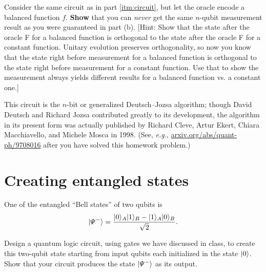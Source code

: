 \documentclass{../phys084}
\begin{document}
\begin{exercise}
\begin{problems}
\begin{center}
    \end{center}

  \item Consider the same circuit as in part \ref{itm:circuit}, but
    let the oracle encode a balanced function \(f\).  \textbf{Show}
    that you can \textit{never} get the same \(n\)-qubit measurement
    result as you were guaranteed in part (b).  [Hint: Show that the
    state after the oracle F for a balanced function is orthogonal to
    the state after the oracle F for a constant function.  Unitary
    evolution preserves orthogonality, so now you know that the state
    right before measurement for a balanced function is orthogonal to
    the state right before measurement for a constant function.  Use
    that to show the measurement always yields different results for a
    balanced function vs. a constant one.]

    This circuit is the \(n\)-bit or generalized Deutsch--Jozsa
    algorithm; though David Deutsch and Richard Jozsa contributed
    greatly to its development, the algorithm in its present form was
    actually published by Richard Cleve, Artur Ekert, Chiara
    Macchiavello, and Michele Mosca in 1998. (See, \textit{e.g.},
    \url{arxiv.org/abs/quant-ph/9708016} after you have solved this
    homework problem.)
  \end{problems}
\end{exercise}

\begin{solution}
  \begin{problems}
  \item
  \item
  \item
  \end{problems}
\end{solution}

\section{Creating entangled states}

\begin{exercise}
  One of the entangled ``Bell states'' of two qubits is
  \[
    \lvert\Psi^-\rangle
    = \frac{\lvert0\rangle_A \lvert1\rangle_B - \lvert1\rangle_A \lvert0\rangle_B}{\sqrt 2}.
  \]

  Design a quantum logic circuit, using gates we have discussed in
  class, to create this two-qubit state starting from input qubits
  each initialized in the state \(\lvert0\rangle\).  Show that your circuit
  produces the state \(\lvert\Psi^-\rangle\) as its output.
\end{exercise}
\end{document}
